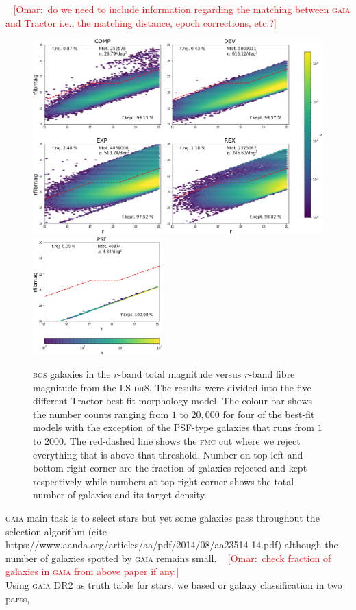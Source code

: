 \documentclass[fleqn,usenatbib]{mnras}
\newcommand{\omar}[1]{~\newline\noindent \textcolor{red}{{ [Omar:~{#1}]\\}}}
\newcommand{\BGS}{\textsc{bgs}\xspace}
\newcommand{\DReight}{\textsc{dr8}\xspace}
\newcommand{\FMC}{{\textsc{fmc}}\xspace}
\newcommand{\GAIA}{\textsc{gaia}\xspace}
\newcommand{\TRACTOR}{\textsc{T}ractor\xspace}
\begin{document}
\omar{do we need to include information regarding the matching between \GAIA and \TRACTOR i.e., the matching distance, epoch corrections, etc.?}

\begin{figure}
	\includegraphics[width=12cm]{images/r_rfibmag_bgsbutfmc_hexbin_extended}
	\includegraphics[width=5cm]{images/r_rfibmag_bgsbutfmc_hexbin_psf}
    \caption{ \BGS galaxies in the $r$-band total magnitude versus $r$-band fibre magnitude from the LS \DReight. The results were divided into the five different \TRACTOR best-fit morphology model. The colour bar shows the number counts ranging from $1$ to $20,000$ for four of the best-fit models with the exception of the PSF-type galaxies that runs from $1$ to $2000$. The red-dashed line shows the \FMC cut where we reject everything that is above that threshold. Number on top-left and bottom-right corner are the fraction of galaxies rejected and kept respectively while numbers at top-right corner shows the total number of galaxies and its target density.}
    \label{fig:fmc}
\end{figure}

\GAIA main task is to select stars but yet some galaxies pass throughout the selection algorithm (cite https://www.aanda.org/articles/aa/pdf/2014/08/aa23514-14.pdf) although the number of galaxies spotted by \GAIA remains small. \omar{check fraction of galaxies in \GAIA from above paper if any.} Using \GAIA DR2 as truth table for stars, we based or galaxy classification in two parts,
\end{document}
